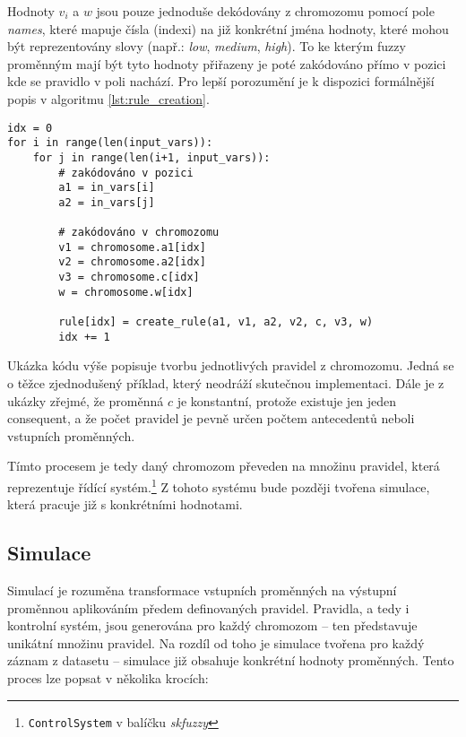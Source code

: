 \documentclass{article}
\begin{document}
Hodnoty $v_i$ a $w$ jsou pouze jednoduše dekódovány z chromozomu pomocí pole \emph{names}, které mapuje čísla (indexi) na již konkrétní jména hodnoty, které mohou být reprezentovány slovy (např.: \emph{low}, \emph{medium}, \emph{high}). To ke kterým fuzzy proměnným mají být tyto hodnoty přiřazeny je poté zakódováno přímo v pozici kde se pravidlo v poli nachází. Pro lepší porozumění je k dispozici formálnější popis v algoritmu \ref{lst:rule_creation}.

\begin{listing}[h]
\begin{verbatim}
idx = 0
for i in range(len(input_vars)):
    for j in range(len(i+1, input_vars)):
        # zakódováno v pozici
        a1 = in_vars[i]
        a2 = in_vars[j]

        # zakódováno v chromozomu
        v1 = chromosome.a1[idx]
        v2 = chromosome.a2[idx]
        v3 = chromosome.c[idx]
        w = chromosome.w[idx]

        rule[idx] = create_rule(a1, v1, a2, v2, c, v3, w)
        idx += 1
\end{verbatim}
\caption{Ukázka kódu výše popisuje tvorbu jednotlivých pravidel z chromozomu. Jedná se o těžce zjednodušený příklad, který neodráží skutečnou implementaci. Dále je z ukázky zřejmé, že proměnná $c$ je konstantní, protože existuje jen jeden consequent, a že počet pravidel je pevně určen počtem antecedentů neboli vstupních proměnných.}
\label{lst:rule_creation}
\end{listing}

Tímto procesem je tedy daný chromozom převeden na množinu pravidel, která reprezentuje řídící systém.\footnote{\texttt{ControlSystem} v balíčku \emph{skfuzzy}} Z tohoto systému bude později tvořena simulace, která pracuje již s konkrétními hodnotami.

\subsection{Simulace}

Simulací je rozuměna transformace vstupních proměnných na výstupní proměnnou aplikováním předem definovaných pravidel. Pravidla, a tedy i kontrolní systém, jsou generována pro každý chromozom -- ten představuje unikátní množinu pravidel. Na rozdíl od toho je simulace tvořena pro každý záznam z datasetu -- simulace již obsahuje konkrétní hodnoty proměnných. Tento proces lze popsat v několika krocích:
\end{document}
